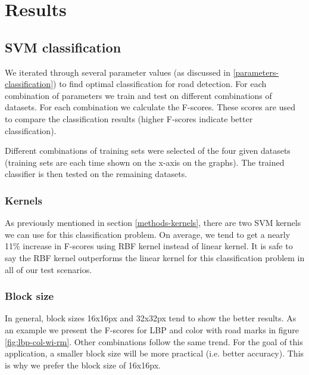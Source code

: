 \documentclass[runningheads,a4paper]{llncs}
\begin{document}
\section{Results}

\subsection{SVM classification}\label{results-svm-classification}
We iterated through several parameter values (as discussed in \ref{parameters-classification}) to find optimal classification for road detection. For each combination of parameters we train and test on different combinations of datasets. For each combination we calculate the F-scores. These scores are used to compare the classification results (higher F-scores indicate better classification). 

Different combinations of training sets were selected of the four given datasets (training sets are each time shown on the x-axis on the graphs). The trained classifier is then tested on the remaining datasets.

\subsubsection{Kernels}
As previously mentioned in section \ref{methods-kernels}, there are two SVM kernels we can use for this classification problem. On average, we tend to get a nearly 11\% increase in F-scores using RBF kernel instead of linear kernel. It is safe to say the RBF kernel outperforms the linear kernel for this classification problem in all of our test scenarios. 

\subsubsection{Block size}
In general, block sizes 16x16px and 32x32px tend to show the better results. As an example we present the F-scores for LBP and color with road marks in figure \ref{fig:lbp-col-wi-rm}. Other combinations follow the same trend. For the goal of this application, a smaller block size will be more practical (i.e. better accuracy). This is why we prefer the block size of 16x16px. 
\end{document}

